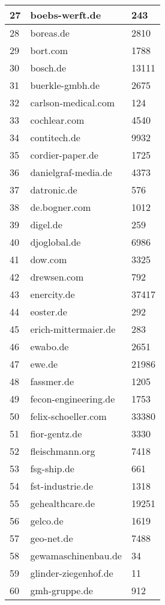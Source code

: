 \begin{longtable}{|m{0.5cm}||m{8cm}|m{5cm}|}
	\hline
	27 & boebs-werft.de & 243\\
	\hline
	28 & boreas.de & 2810\\
	\hline
	29 & bort.com & 1788\\
	\hline
	30 & bosch.de & 13111\\
	\hline
	31 & buerkle-gmbh.de & 2675\\
	\hline
	32 & carlson-medical.com & 124\\
	\hline
	33 & cochlear.com & 4540\\
	\hline
	34 & contitech.de & 9932\\
	\hline
	35 & cordier-paper.de & 1725\\
	\hline
	36 & danielgraf-media.de & 4373\\
	\hline
	37 & datronic.de & 576\\
	\hline
	38 & de.bogner.com & 1012\\
	\hline
	39 & digel.de & 259\\
	\hline
	40 & djoglobal.de & 6986\\
	\hline
	41 & dow.com & 3325\\
	\hline
	42 & drewsen.com & 792\\
	\hline
	43 & enercity.de & 37417\\
	\hline
	44 & eoster.de & 292\\
	\hline
	45 & erich-mittermaier.de & 283\\
	\hline
	46 & ewabo.de & 2651\\
	\hline
	47 & ewe.de & 21986\\
	\hline
	48 & fassmer.de & 1205\\
	\hline
	49 & fecon-engineering.de & 1753\\
	\hline
	50 & felix-schoeller.com & 33380\\
	\hline
	51 & fior-gentz.de & 3330\\
	\hline
	52 & fleischmann.org & 7418\\
	\hline
	53 & fsg-ship.de & 661\\
	\hline
	54 & fst-industrie.de & 1318\\
	\hline
	55 & gehealthcare.de & 19251\\
	\hline
	56 & gelco.de & 1619\\
	\hline
	57 & geo-net.de & 7488\\
	\hline
	58 & gewamaschinenbau.de & 34\\
	\hline
	59 & glinder-ziegenhof.de & 11\\
	\hline
	60 & gmh-gruppe.de & 912\\

\end{longtable}
